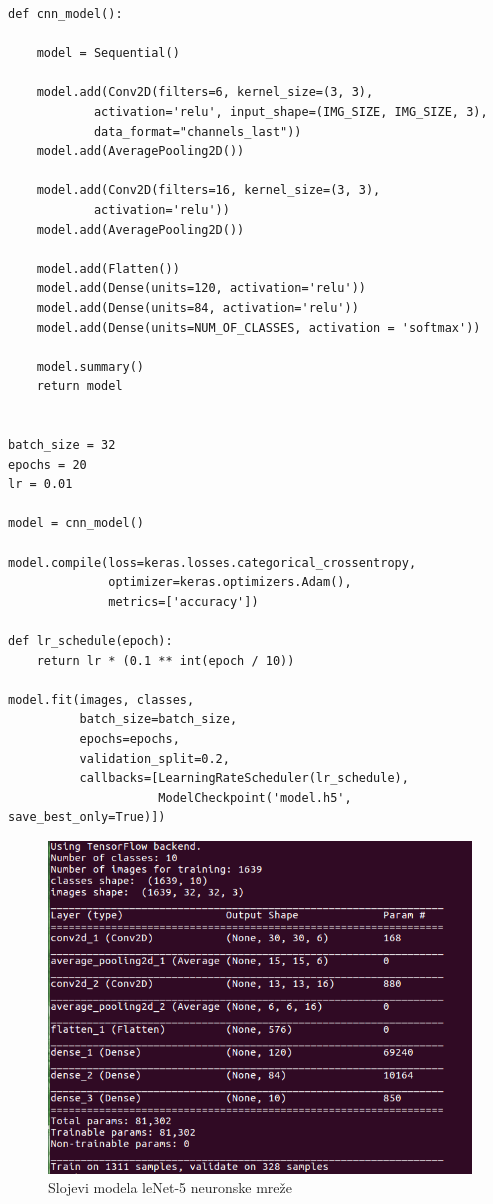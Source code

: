 \documentclass[a4paper]{article}
\begin{document}
\begin{lstlisting}[caption={LeNet-5},frame=single, label=code:leNet]
def cnn_model():
    
    model = Sequential()

    model.add(Conv2D(filters=6, kernel_size=(3, 3), 
    		activation='relu', input_shape=(IMG_SIZE, IMG_SIZE, 3),
    		data_format="channels_last"))
    model.add(AveragePooling2D())

    model.add(Conv2D(filters=16, kernel_size=(3, 3), 
    		activation='relu'))
    model.add(AveragePooling2D())

    model.add(Flatten())
    model.add(Dense(units=120, activation='relu'))
    model.add(Dense(units=84, activation='relu'))
    model.add(Dense(units=NUM_OF_CLASSES, activation = 'softmax'))
    
    model.summary()
    return model


batch_size = 32   
epochs = 20
lr = 0.01         

model = cnn_model()

model.compile(loss=keras.losses.categorical_crossentropy, 
			  optimizer=keras.optimizers.Adam(),
			  metrics=['accuracy'])

def lr_schedule(epoch):
    return lr * (0.1 ** int(epoch / 10))

model.fit(images, classes,
          batch_size=batch_size,
          epochs=epochs,
          validation_split=0.2,
          callbacks=[LearningRateScheduler(lr_schedule), 
          			 ModelCheckpoint('model.h5', save_best_only=True)])
\end{lstlisting}


\begin{figure}[h!]
\begin{center}
\includegraphics[scale=0.35]{leNet_arhitektura.png}
\end{center}
\caption{Slojevi modela leNet-5 neuronske mreže}
\label{fig:leNet_arh}
\end{figure}
\end{document}
